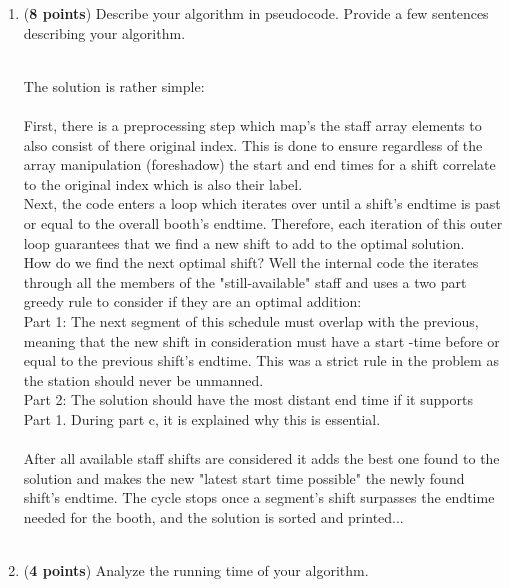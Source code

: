 \documentclass[11pt]{article}
\theoremstyle{definition}
\theoremstyle{theorem}
\newcommand{\solution}{\medskip\noindent{\color{DarkBlue}\textbf{Solution:}}}
\begin{document}
\begin{enumerate}[label=(\alph*)]


\item(\textbf{8 points}) Describe your algorithm in pseudocode. Provide a few sentences describing your algorithm.

\solution \\

 

The solution is rather simple:\\\\
First, there is a preprocessing step which map's the staff array elements to also consist of there original
index. This is done to ensure regardless of the array manipulation (foreshadow) the start and end times for a shift
correlate to the original index which is also their label.\\
Next, the code enters a loop which iterates over until a shift's endtime is past or equal to the overall booth's
endtime. Therefore, each iteration of this outer loop guarantees that we find a new shift to add to the optimal solution.\\
How do we find the next optimal shift? Well the internal code the iterates through all the members of the "still-available" staff
and uses a two part greedy rule to consider if they are an optimal addition:\\
Part 1: The next segment of this schedule must overlap with the previous, meaning that the new shift in consideration must have a start
-time before or equal to the previous shift's endtime. This was a strict rule in the problem as the station should never be unmanned.\\
Part 2: The solution should have the most distant end time if it supports Part 1. During part c, it is explained why this is essential.\\\\

After all available staff shifts are considered it adds the best one found to the solution and makes the new "latest start time possible" the newly found shift's endtime.
The cycle stops once a segment's shift surpasses the endtime needed for the booth, and the solution is sorted and printed...\\\\




\item (\textbf{4 points}) Analyze the running time of your algorithm.


\end{enumerate}
\end{document}
